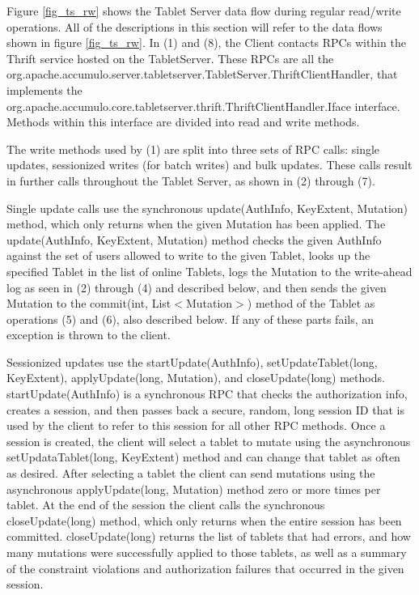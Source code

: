 \documentclass[letterpaper,onecolumn,12pt,titlepage]{article}
\begin{document}
Figure \ref{fig_ts_rw} shows the Tablet Server data flow during regular read/write operations.
All of the descriptions in this section will refer to the data flows shown in figure \ref{fig_ts_rw}.
In (1) and (8), the Client contacts RPCs within the Thrift service hosted on the TabletServer.  
These RPCs are all the org.apache.accumulo.server.tabletserver.TabletServer.ThriftClientHandler, that implements the org.apache.accumulo.core.tabletserver.thrift.ThriftClientHandler.Iface interface.
Methods within this interface are divided into read and write methods.

The write methods used by (1) are split into three sets of RPC calls: single updates, sessionized writes (for batch writes) and bulk updates.
These calls result in further calls throughout the Tablet Server, as shown in (2) through (7).

Single update calls use the synchronous update(AuthInfo, KeyExtent, Mutation) method, which only returns when the given Mutation has been applied.
The update(AuthInfo, KeyExtent, Mutation) method checks the given AuthInfo against the set of users allowed to write to the given Tablet, 
looks up the specified Tablet in the list of online Tablets, logs the Mutation to the write-ahead log as seen in (2) through (4) and described below, 
and then sends the given Mutation to the commit(int, List$<$Mutation$>$) method of the Tablet as operations (5) and (6), also described below.
If any of these parts fails, an exception is thrown to the client.

Sessionized updates use the startUpdate(AuthInfo), setUpdateTablet(long, KeyExtent), applyUpdate(long, Mutation), and closeUpdate(long) methods.
startUpdate(AuthInfo) is a synchronous RPC that checks the authorization info, creates a session, and then passes back a secure, random, long session ID that is used by the client to refer to this session for all other RPC methods.
Once a session is created, the client will select a tablet to mutate using the asynchronous setUpdataTablet(long, KeyExtent) method and can change that tablet as often as desired.
After selecting a tablet the client can send mutations using the asynchronous applyUpdate(long, Mutation) method zero or more times per tablet.
At the end of the session the client calls the synchronous closeUpdate(long) method, which only returns when the entire session has been committed.
closeUpdate(long) returns the list of tablets that had errors, and how many mutations were successfully applied to those tablets, as well as a summary of the constraint violations and authorization failures that occurred in the given session.
\end{document}

